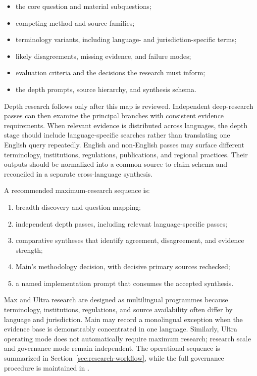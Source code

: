\documentclass[11pt,a4paper]{article}
\begin{document}
\begin{itemize}
  \item the core question and material subquestions;
  \item competing method and source families;
  \item terminology variants, including language- and jurisdiction-specific terms;
  \item likely disagreements, missing evidence, and failure modes;
  \item evaluation criteria and the decisions the research must inform;
  \item the depth prompts, source hierarchy, and synthesis schema.
\end{itemize}

Depth research follows only after this map is reviewed. Independent deep-research passes can then examine the principal branches with consistent evidence requirements. When relevant evidence is distributed across languages, the depth stage should include language-specific searches rather than translating one English query repeatedly. English and non-English passes may surface different terminology, institutions, regulations, publications, and regional practices. Their outputs should be normalized into a common source-to-claim schema and reconciled in a separate cross-language synthesis.

A recommended maximum-research sequence is:

\begin{enumerate}
  \item breadth discovery and question mapping;
  \item independent depth passes, including relevant language-specific passes;
  \item comparative syntheses that identify agreement, disagreement, and evidence strength;
  \item Main's methodology decision, with decisive primary sources rechecked;
  \item a named implementation prompt that consumes the accepted synthesis.
\end{enumerate}

Max and Ultra research are designed as multilingual programmes because terminology, institutions, regulations, and source availability often differ by language and jurisdiction. Main may record a monolingual exception when the evidence base is demonstrably concentrated in one language. Similarly, Ultra operating mode does not automatically require maximum research; research scale and governance mode remain independent. The operational sequence is summarized in Section~\ref{sec:research-workflow}, while the full governance procedure is maintained in .
\end{document}
